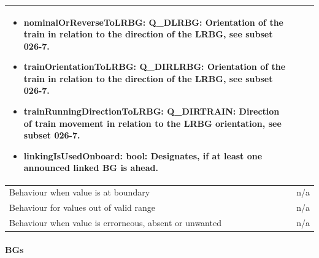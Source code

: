 \begin{longtable}{p{}p{}}
\begin{itemize}
\item nominalOrReverseToLRBG: Q\_DLRBG: Orientation of the train in relation to the direction of the LRBG, see subset 026-7.
\item trainOrientationToLRBG: Q\_DIRLRBG: Orientation of the train in relation to the direction of the LRBG, see subset 026-7.
\item trainRunningDirectionToLRBG: Q\_DIRTRAIN: Direction of train movement in relation to the LRBG orientation, see subset 026-7.
\item linkingIsUsedOnboard: bool: Designates, if at least one announced linked BG is ahead.
\end{itemize} 
\\
\midrule
Behaviour when value is at boundary	& n/a \\
\midrule
Behaviour for values out of valid range	& n/a \\
\midrule
Behaviour when value is errorneous, absent or unwanted & n/a \\
\bottomrule
\end{longtable}


\paragraph{BGs}

